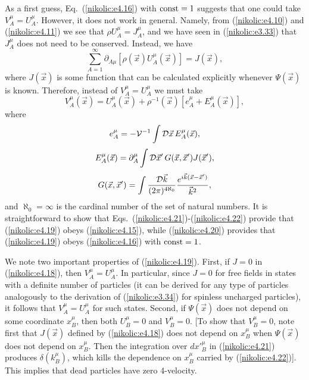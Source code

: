 \documentclass[12pt,twoside]{report} %
\begin{document}
As a first guess, Eq.~(\ref{nikolic:e4.16}) with  ${\rm const}=1$ suggests that one could take
$V^{\mu}_A=U^{\mu}_A$. However, it does not work in general. Namely, 
from (\ref{nikolic:e4.10}) and (\ref{nikolic:e4.11}) we see that 
$\rho U^{\mu}_A =J^{\mu}_A$, and we have seen in (\ref{nikolic:e3.33})
that $ J^{\mu}_A$ does not need to be conserved. Instead, we have
\begin{equation}\label{nikolic:e4.18}
 \sum_{A=1}^{\infty}\partial_{A\mu}[\rho(\vec{x}) U^{\mu}_A(\vec{x})] = J(\vec{x}) ,
\end{equation}
where $J(\vec{x})$ is some function that can be calculated explicitly whenever 
$\Psi(\vec{x})$ is known. Therefore, instead of $V^{\mu}_A=U^{\mu}_A$
we must take
\begin{equation}\label{nikolic:e4.19}
 V^{\mu}_A(\vec{x})=U^{\mu}_A(\vec{x}) +
\rho^{-1}(\vec{x}) [e^{\mu}_A + E^{\mu}_A(\vec{x})] ,
\end{equation}
where
\begin{equation}\label{nikolic:e4.20}
 e^{\mu}_A=-{\cal V}^{-1} \int {\cal D}\vec{x}\, E^{\mu}_A(\vec{x}) ,
\end{equation}
\begin{equation}\label{nikolic:e4.21}
 E^{\mu}_A(\vec{x})=\partial^{\mu}_A 
\int {\cal D}\vec{x}'\, G(\vec{x},\vec{x}') J(\vec{x}') ,
\end{equation}
\begin{equation}\label{nikolic:e4.22}
 G(\vec{x},\vec{x}') = \int \frac{{\cal D}\vec{k}}{(2\pi)^{4\aleph_0}} 
\frac{e^{i\vec{k}(\vec{x}-\vec{x}')}}{\vec{k}^2} ,
\end{equation}
and $\aleph_0=\infty$ is the cardinal number of the set of natural numbers.
It is straightforward to show that
Eqs.~(\ref{nikolic:e4.21})-(\ref{nikolic:e4.22}) provide that (\ref{nikolic:e4.19}) obeys (\ref{nikolic:e4.15}), 
while (\ref{nikolic:e4.20}) provides that (\ref{nikolic:e4.19}) obeys (\ref{nikolic:e4.16}) with ${\rm const}=1$.


We note two important properties of (\ref{nikolic:e4.19}). First, if $J=0$ in (\ref{nikolic:e4.18}),
then $V^{\mu}_A=U^{\mu}_A$. In particular, since $J=0$ for free fields in states
with a definite number of particles (it can be derived for any type of particles 
analogously to the derivation of (\ref{nikolic:e3.34}) for spinless uncharged particles), 
it follows that $V^{\mu}_A=U^{\mu}_A$ for such states.
Second, if $\Psi(\vec{x})$ does not depend
on some coordinate $x^{\mu}_B$, then both $U^{\mu}_B=0$ and
$V^{\mu}_B=0$. [To show that $V^{\mu}_B=0$, note first that $J(\vec{x})$ defined
by (\ref{nikolic:e4.18}) does not depend on $x^{\mu}_B$ when $\Psi(\vec{x})$ does not depend
on $x^{\mu}_B$. Then the integration over $dx'^{\mu}_B$ in (\ref{nikolic:e4.21}) produces
$\delta(k^{\mu}_B)$, which kills the dependence on $x^{\mu}_B$ carried by 
(\ref{nikolic:e4.22})].
This implies that dead particles have zero 4-velocity.
\end{document}
